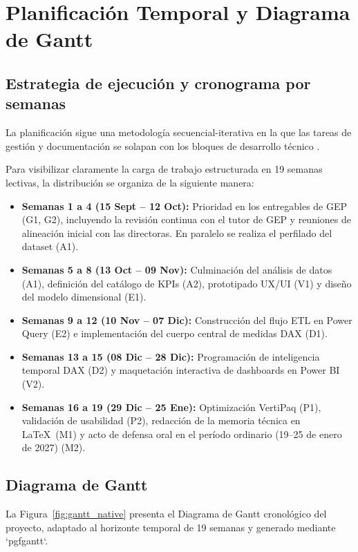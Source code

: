 \documentclass[12pt, a4paper, twoside]{report}
\begin{document}

\chapter{Planificación Temporal y Diagrama de Gantt}
\section{Estrategia de ejecución y cronograma por semanas}
La planificación sigue una metodología secuencial-iterativa en la que las tareas de gestión y documentación se solapan con los bloques de desarrollo técnico \cite{schwaber2020scrum}. 

Para visibilizar claramente la carga de trabajo estructurada en 19 semanas lectivas, la distribución se organiza de la siguiente manera:

\begin{itemize} [itemsep=10pt, topsep=6pt]
    \item \textbf{Semanas 1 a 4 (15 Sept -- 12 Oct):} Prioridad en los entregables de GEP (G1, G2), incluyendo la revisión continua con el tutor de GEP y reuniones de alineación inicial con las directoras. En paralelo se realiza el perfilado del dataset (A1).
    \item \textbf{Semanas 5 a 8 (13 Oct -- 09 Nov):} Culminación del análisis de datos (A1), definición del catálogo de KPIs (A2), prototipado UX/UI (V1) y diseño del modelo dimensional (E1).
    \item \textbf{Semanas 9 a 12 (10 Nov -- 07 Dic):} Construcción del flujo ETL en Power Query (E2) e implementación del cuerpo central de medidas DAX (D1).
    \item \textbf{Semanas 13 a 15 (08 Dic -- 28 Dic):} Programación de inteligencia temporal DAX (D2) y maquetación interactiva de dashboards en Power BI (V2).
    \item \textbf{Semanas 16 a 19 (29 Dic -- 25 Ene):} Optimización VertiPaq (P1), validación de usabilidad (P2), redacción de la memoria técnica en \LaTeX\ (M1) y acto de defensa oral en el período ordinario (19--25 de enero de 2027) (M2).
\end{itemize}

\clearpage\section{Diagrama de Gantt}
La Figura~\ref{fig:gantt_native} presenta el Diagrama de Gantt cronológico del proyecto, adaptado al horizonte temporal de 19 semanas y generado mediante `pgfgantt`.
\end{document}
